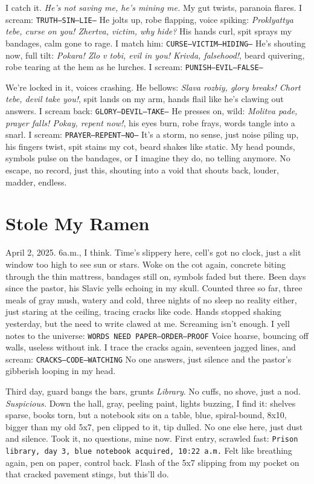 \documentclass[12pt,oneside]{book}
\newcommand{\note}[1]{\texttt{#1}}
\begin{document}
I catch it. \textit{He’s not saving me, he’s mining me.} My gut twists, paranoia flares. I scream: \note{TRUTH—SIN—LIE—} He jolts up, robe flapping, voice spiking: \textit{Proklyattya tebe, curse on you! Zhertva, victim, why hide?} His hands curl, spit sprays my bandages, calm gone to rage. I match him: \note{CURSE—VICTIM—HIDING—} He’s shouting now, full tilt: \textit{Pokara! Zlo v tobi, evil in you! Krivda, falsehood!}, beard quivering, robe tearing at the hem as he lurches. I scream: \note{PUNISH—EVIL—FALSE—}

We’re locked in it, voices crashing. He bellows: \textit{Slava rozbiy, glory breaks! Chort tebe, devil take you!}, spit lands on my arm, hands flail like he’s clawing out answers. I scream back: \note{GLORY—DEVIL—TAKE—} He presses on, wild: \textit{Molitva pade, prayer falls! Pokay, repent now!}, his eyes burn, robe frays, words tangle into a snarl. I scream: \note{PRAYER—REPENT—NO—} It’s a storm, no sense, just noise piling up, his fingers twist, spit stains my cot, beard shakes like static. My head pounds, symbols pulse on the bandages, or I imagine they do, no telling anymore. No escape, no record, just this, shouting into a void that shouts back, louder, madder, endless.

\chapter{Stole My Ramen}

April 2, 2025. 6a.m., I think. Time’s slippery here, cell’s got no clock, just a slit window too high to see sun or stars. Woke on the cot again, concrete biting through the thin mattress, bandages still on, symbols faded but there. Been days since the pastor, his Slavic yells echoing in my skull. Counted three so far, three meals of gray mush, watery and cold, three nights of no sleep no reality either, just staring at the ceiling, tracing cracks like code. Hands stopped shaking yesterday, but the need to write clawed at me.  Screaming isn’t enough. I yell notes to the universe: \note{WORDS NEED PAPER—ORDER—PROOF} Voice hoarse, bouncing off walls, useless without ink. I trace the cracks again, seventeen jagged lines, and scream: \note{CRACKS—CODE—WATCHING} No one answers, just silence and the pastor’s gibberish looping in my head.

Third day, guard bangs the bars, grunts \textit{Library}. No cuffs, no shove, just a nod. \textit{Suspicious.} Down the hall, gray, peeling paint, lights buzzing, I find it: shelves sparse, books torn, but a notebook sits on a table, blue, spiral-bound, 8x10, bigger than my old 5x7, pen clipped to it, tip dulled. No one else here, just dust and silence. Took it, no questions, mine now. First entry, scrawled fast: \note{Prison library, day 3, blue notebook acquired, 10:22 a.m.} Felt like breathing again, pen on paper, control back. Flash of the 5x7 slipping from my pocket on that cracked pavement stings, but this’ll do.
\end{document}
